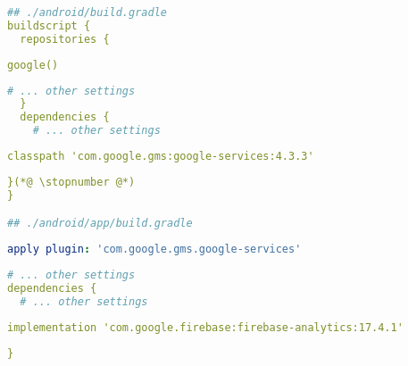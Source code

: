 \begin{lstlisting}[language=yaml]
## ./android/build.gradle
buildscript {
  repositories {
\end{lstlisting}
{
\xpretocmd{\lstlisting}{\vspace{-12pt}}{}{}
\begin{lstlisting}[firstnumber=4, language=yaml, backgroundcolor=\color{backgreen}]
      google()
\end{lstlisting}
\begin{lstlisting}[firstnumber=5, language=yaml]
      # ... other settings
  }
  dependencies {
    # ... other settings
\end{lstlisting}
\begin{lstlisting}[firstnumber=9, language=yaml, backgroundcolor=\color{backgreen}]
    classpath 'com.google.gms:google-services:4.3.3'
\end{lstlisting}
\begin{lstlisting}[firstnumber=10, language=yaml]
  }(*@ \stopnumber @*)
}

## ./android/app/build.gradle
\end{lstlisting}
\begin{lstlisting}[firstnumber=2, language=yaml, backgroundcolor=\color{backgreen}]
apply plugin: 'com.google.gms.google-services'
\end{lstlisting}
\begin{lstlisting}[firstnumber=3, language=yaml]
# ... other settings
dependencies {
  # ... other settings
\end{lstlisting}
\begin{lstlisting}[firstnumber=6, language=yaml, backgroundcolor=\color{backgreen}]
  implementation 'com.google.firebase:firebase-analytics:17.4.1'
\end{lstlisting}
\begin{lstlisting}[firstnumber=7, language=yaml]
}
\end{lstlisting}
}
